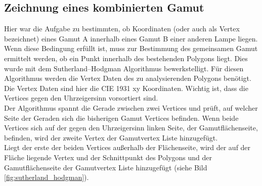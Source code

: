 \documentclass[11pt]{scrartcl}
\begin{document}
\subsection{Zeichnung eines kombinierten Gamut}
Hier war die Aufgabe zu bestimmten, ob Koordinaten (oder auch als Vertex bezeichnet) eines Gamut A innerhalb eines Gamut B einer anderen Lampe liegen. Wenn diese
Bedingung erfüllt ist, muss zur Bestimmung des gemeinsamen Gamut ermittelt werden, ob ein Punkt innerhalb des bestehenden Polygons liegt. Dies wurde mit dem
Sutherland–Hodgman Algorithmus \cite{sutherlandHodgman} bewerkstelligt. Für diesen Algorithmus werden die Vertex Daten des zu analysierenden Polygons benötigt. Die
Vertex Daten sind hier die CIE 1931 xy Koordinaten. Wichtig ist, dass die Vertices gegen den Uhrzeigersinn vorsortiert sind.\\
Der Algorithmus spannt die Gerade zwischen zwei Vertices und prüft, auf welcher Seite der Geraden sich die bisherigen Gamut Vertices befinden. Wenn beide Vertices
sich auf der gegen den Uhrzeigersinn linken Seite, der Gamutflächenseite, befinden, wird der zweite Vertex der Gamutvertex Liste hinzugefügt.\\
Liegt der erste der beiden Vertices außerhalb der Flächenseite, wird der auf der Fläche liegende Vertex und der Schnittpunkt des Polygons und der Gamutflächenseite der
Gamutvertex Liste hinzugefügt (siehe Bild \ref{fig:sutherland_hodgman}).\\
\end{document}
